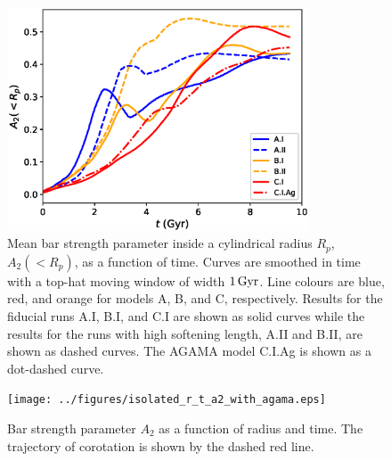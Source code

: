 \begin{figure}
	\centering
	\includegraphics[width=0.8\textwidth]{../figures/isolated_a2_vs_t_2rd_weighted.eps}
	\caption{Mean bar strength parameter inside a cylindrical
          radius $R_p$, $A_2(<R_p)$, as a function of time. Curves are
          smoothed in time with a top-hat moving window of width
          $1\,{\rm Gyr}$.  Line colours are blue, red, and {orange} for
          models A, B, and C, respectively.  Results for the
          fiducial runs A.I, B.I, and C.I are shown as solid curves
          while the results for the runs with high softening length,
          A.II and B.II, are shown as dashed curves.  The
          \textsc{AGAMA} model C.I.Ag is shown as a dot-dashed
          curve.} \label{fig:isolated_a2_vs_t}
\end{figure}

\begin{figure}
	\centering
	\texttt{[image: ../figures/isolated\_r\_t\_a2\_with\_agama.eps]}
	\caption{Bar strength parameter $A_2$ as a function of radius
          and time.  The trajectory of corotation is shown by the
          dashed red line.} \label{fig:isolated_r_t_a2}
\end{figure}

